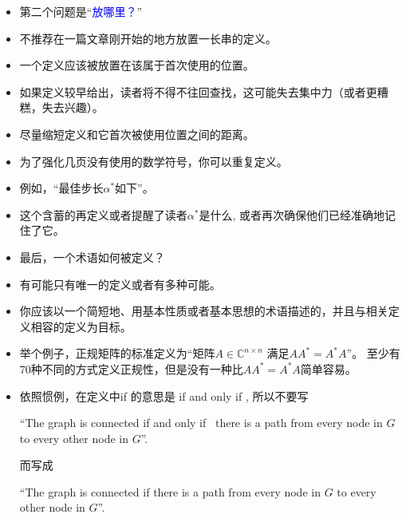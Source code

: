 \documentclass[13pt]{ctexbeamer}
\newcommand{\blue}[1]{\textcolor{blue}{#1}}
\begin{document}
\begin{frame}
\begin{itemize}
	\item  第二个问题是``\blue{放哪里？}'' 
	\item 不推荐在一篇文章刚开始的地方放置一长串的定义。
	\item  一个定义应该被放置在该属于首次使用的位置。
	\item 如果定义较早给出，读者将不得不往回查找，这可能失去集中力（或者更糟糕，失去兴趣）。
	\item 尽量缩短定义和它首次被使用位置之间的距离。
\end{itemize}
\end{frame}


\begin{frame}
\begin{itemize}
	\item  为了强化几页没有使用的数学符号，你可以重复定义。
	
	\item 例如，``最佳步长$\alpha^{*}$如下''。
	
	\item  这个含蓄的再定义或者提醒了读者$\alpha^{*}$是什么, 或者再次确保他们已经准确地记住了它。
\end{itemize}
\end{frame}


\begin{frame}
	\begin{itemize}
		\item  最后，一个术语如何被定义？
		\item 有可能只有唯一的定义或者有多种可能。
		\item 你应该以一个简短地、用基本性质或者基本思想的术语描述的，并且与相关定义相容的定义为目标。
		\item 举个例子，正规矩阵的标准定义为“矩阵$A\in \mathbb{C}^{n\times n}$ 满足$AA^{*}= A^{*}A$”。 至少有70种不同的方式定义正规性，但是没有一种比$AA^{*}= A^{*}A$简单容易。
	\end{itemize}
\end{frame}


\begin{frame}
\begin{itemize}
\item 依照惯例，在定义中if 的意思是 if and only if , 所以不要写 

``The graph is connected  \alert{if and only if }~there is a path from every node in $G$ to every other node in $G$''.

而写成

``The graph is connected \alert{if}  there is a path from every node in $G$ to every other node in $G$''.

\end{itemize}
\end{frame}
\end{document}

